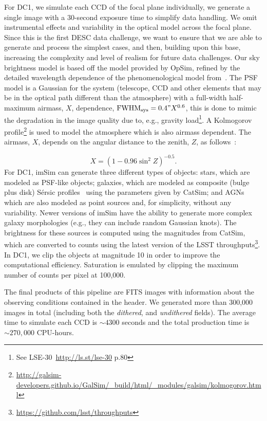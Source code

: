 \documentclass[\docopts]{\docclass}
\begin{document}
For DC1, we simulate each CCD of the focal plane individually, we generate a single image with a 30-second exposure time to simplify data handling. We omit instrumental effects and variability in the optical model across the focal plane. Since this is the first DESC data challenge, we want to ensure that we are able to generate and process the simplest cases, and then, building upon this base, increasing the complexity and level of realism for future data challenges. Our sky brightness model is based off the \citet{1991PASP..103.1033K} model provided by OpSim, refined by the detailed wavelength dependence of the phenomenological model from~\citet{2016SPIE.9910E..1AY}. The PSF model is a Gaussian for the system (telescope, CCD and other elements that may be in the optical path different than the atmosphere) with a full-width half-maximum airmass, $X$, dependence, $\mathrm{FWHM_{sys}} = 0.4" X^{0.6}$, this is done to mimic the degradation in the image quality due to, e.g., gravity load\footnote{See LSE-30~\url{http://ls.st/lse-30} p.80}. A Kolmogorov profile\footnote{\url{http://galsim-developers.github.io/GalSim/_build/html/_modules/galsim/kolmogorov.html}} is used to model the atmosphere which is also airmass dependent. The airmass, $X$, depends on the angular distance to the zenith, $Z$, as follows~\citep{1991PASP..103.1033K}:

\begin{equation}
X = (1 - 0.96\sin^{2}{Z})^{-0.5}.
\end{equation}
For DC1, imSim can generate three different types of objects: stars, which are modeled as PSF-like objects; galaxies, which are modeled as composite (bulge plus disk) S\'{e}rsic profiles~\citep{1963BAAA....6...41S} using
the parameters given by CatSim; and AGNs which are also modeled as point sources and, for simplicity, without any variability. Newer versions of imSim have the ability to generate more complex galaxy morphologies (e.g., they can include random Gaussian knots). The brightness for these sources is computed using the magnitudes from CatSim, which are converted to counts using the latest version of the LSST throughputs\footnote{\url{https://github.com/lsst/throughputs}}. In DC1, we clip the objects at magnitude 10 in order to improve the computational efficiency. Saturation is emulated by clipping the maximum number of counts per pixel at 100,000.

The final products of this pipeline are FITS images with information about the observing conditions contained in the header. We generated more than 300,000 images in total (including both the \textit{dithered}, and \textit{undithered} fields). The average time to simulate each CCD is $\sim 4300$ seconds and the total production time is $\sim 270,000$ CPU-hours.
\end{document}
